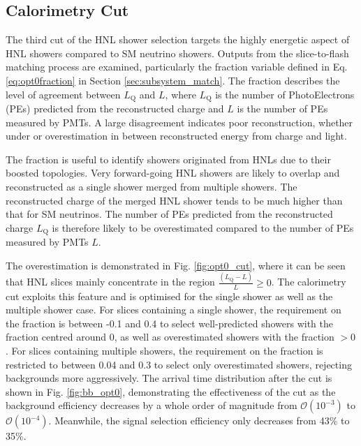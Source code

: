 \subsection{Calorimetry Cut}
\label{sec:calo_cut}

The third cut of the HNL shower selection targets the highly energetic aspect of HNL showers compared to SM neutrino showers.
Outputs from the slice-to-flash matching process are examined, particularly the fraction variable defined in Eq. \ref{eq:opt0fraction} in Section \ref{sec:subsystem_match}.
The fraction describes the level of agreement between $L_{\mathrm{Q}}$ and $L$, where $L_\mathrm{Q}$ is the number of PhotoElectrons (PEs) predicted from the reconstructed charge and $L$ is the number of PEs measured by PMTs.
A large disagreement indicates poor reconstruction, whether under or overestimation in between reconstructed energy from charge and light.

The fraction is useful to identify showers originated from HNLs due to their boosted topologies.
Very forward-going HNL showers are likely to overlap and reconstructed as a single shower merged from multiple showers.   
The reconstructed charge of the merged HNL shower tends to be much higher than that for SM neutrinos.
The number of PEs predicted from the reconstructed charge $L_{\mathrm{Q}}$ is therefore likely to be overestimated compared to the number of PEs measured by PMTs $L$.

The overestimation is demonstrated in Fig. \ref{fig:opt0_cut}, where it can be seen that HNL slices mainly concentrate in the region $\frac{(L_{\mathrm{Q}} - L)}{L} \geq 0$. 
The calorimetry cut exploits this feature and is optimised for the single shower as well as the multiple shower case.
For slices containing a single shower, the requirement on the fraction is between -0.1 and 0.4 to select well-predicted showers with the fraction centred around 0, as well as overestimated showers with the fraction $> 0$. 
For slices containing multiple showers, the requirement on the fraction is restricted to between 0.04 and 0.3 to select only overestimated showers, rejecting backgrounds more aggressively.
The arrival time distribution after the cut is shown in Fig. \ref{fig:bb_opt0}, demonstrating the effectiveness of the cut as the background efficiency decreases by a whole order of magnitude from $\mathcal{O}(10^{-3})$ to $\mathcal{O}(10^{-4})$. 
Meanwhile, the signal selection efficiency only decreases from 43\% to 35\%.


